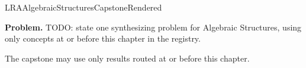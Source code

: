 \ifcsname LRAAlgebraicStructuresCapstoneRendered\endcsname
\else
\expandafter\gdef\csname LRAAlgebraicStructuresCapstoneRendered\endcsname{}

\newpage
{}
\label{cap:algebraic-structures}

\begin{tcolorbox}[
  colback=gray!6,
  colframe=gray!40,
  arc=2pt,
  left=8pt, right=8pt, top=6pt, bottom=6pt,
  title={\small\textbf{Capstone Problem}},
  fonttitle=\small\bfseries
]
\textbf{Problem.}
TODO: state one synthesizing problem for Algebraic Structures, using only concepts at or
before this chapter in the registry.
\end{tcolorbox}

\begin{remark*}
The capstone may use only results routed at or before this chapter.
\end{remark*}

\clearpage
\fi
